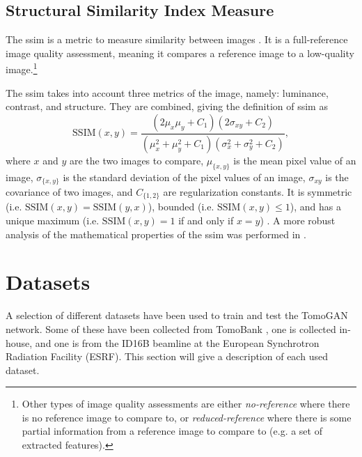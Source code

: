 \subsection{Structural Similarity Index Measure}
The \gls{ssim} is a metric to measure similarity between images \cite{ssim}. It is a full-reference image quality assessment, meaning it compares a reference image to a low-quality image.\footnote{Other types of image quality assessments are either \textit{no-reference} where there is no reference image to compare to, or \textit{reduced-reference} where there is some partial information from a reference image to compare to (e.g. a set of extracted features)\cite{ssim}. }

The \gls{ssim} takes into account three metrics of the image, namely: luminance, contrast, and structure. They are combined, giving the definition of \gls{ssim} as \cite{ssim}
\begin{equation}
    \label{eq:ssim}
    \text{SSIM}\left(x,y\right) = \frac{\left( 2\mu_x \mu_y + C_1 \right) \left( 2\sigma_{xy} + C_2 \right)}{\left( \mu_x^2 + \mu_y^2 + C_1 \right) \left( \sigma_x^2 + \sigma_y^2 + C_2 \right)},
\end{equation}
where $x$ and $y$ are the two images to compare, $\mu_{\{x,y\}}$ is the mean pixel value of an image, $\sigma_{\{x,y\}}$ is the standard deviation of the pixel values of an image, $\sigma_{xy}$ is the covariance of two images, and $C_{\{1,2\}}$ are regularization constants. It is symmetric (i.e. $\text{SSIM}\left(x,y\right) = \text{SSIM}\left(y,x\right)$), bounded (i.e. $\text{SSIM}\left(x,y\right) \leq 1$), and has a unique maximum (i.e. $\text{SSIM}\left(x,y\right) = 1$ if and only if $x = y$) \cite{ssim}. A more robust analysis of the mathematical properties of the \gls{ssim} was performed in \cite{6059504}.


\section{Datasets}
\label{sec:method:datasets}
A selection of different datasets have been used to train and test the TomoGAN network. Some of these have been collected from TomoBank \cite{TomoBank}, one is collected in-house, and one is from the ID16B beamline at the European Synchrotron Radiation Facility (ESRF). This section will give a description of each used dataset. 

